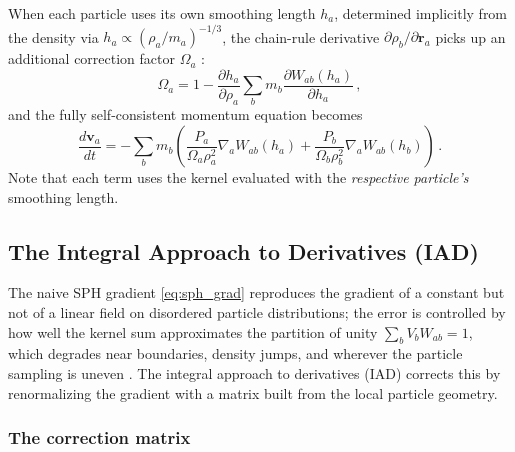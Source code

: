 When each particle uses its own smoothing length $h_a$, determined implicitly from the density via $h_a \propto (\rho_a / m_a)^{-1/3}$, the chain-rule derivative $\partial \rho_b / \partial \mathbf{r}_a$ picks up an additional correction factor $\Omega_a$ \cite{Rosswog2009}:
\begin{equation}
    \Omega_a = 1 - \frac{\partial h_a}{\partial \rho_a} \sum_b m_b \frac{\partial W_{ab}(h_a)}{\partial h_a}\,,
    \label{eq:gradh_omega}
\end{equation}
and the fully self-consistent momentum equation becomes
\begin{equation}
    \frac{d\mathbf{v}_a}{dt} = -\sum_b m_b \left( \frac{P_a}{\Omega_a \rho_a^2} \nabla_a W_{ab}(h_a) + \frac{P_b}{\Omega_b \rho_b^2} \nabla_a W_{ab}(h_b) \right)\,.
    \label{eq:sph_mom_gradh}
\end{equation}
Note that each term uses the kernel evaluated with the \emph{respective particle's} smoothing length.



\subsection{The Integral Approach to Derivatives (IAD)}
\label{sec:iad}

The naive SPH gradient \eqref{eq:sph_grad} reproduces the gradient of a constant but not of a linear field on disordered particle distributions; the error is controlled by how well the kernel sum approximates the partition of unity $\sum_b V_b W_{ab} = 1$, which degrades near boundaries, density jumps, and wherever the particle sampling is uneven \cite{GarciaSenz2012}. The integral approach to derivatives (IAD) corrects this by renormalizing the gradient with a matrix built from the local particle geometry.


\subsubsection*{The correction matrix}

